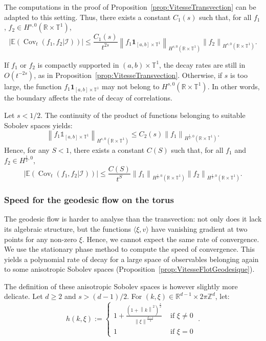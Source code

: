 \documentclass[10pt]{amsart}
\theoremstyle{definition}\newtheorem{defi}[theo]{Definition}\newtheorem{rema}[theo]{Remark}\newtheorem{exam}[theo]{Example}\newtheorem{exem}[theo]{Example}\newtheorem{nota}[theo]{Notation}
\DeclareMathOperator{\Cov}{Cov}
\newcommand{\Z}{\mathbb{Z}}
\newcommand{\R}{\mathbb{R}}
\newcommand{\Ebb}{\mathbb{E}}
\newcommand{\Tbb}{\mathbb{T}}
\newcommand{\Ical}{\mathcal{I}}
\newcommand{\norm}[2]{\left\| #1 \right\|_{#2}}
\newcommand*{\un}{\mathds{1}}
\begin{document}

The computations in the proof of Proposition~\ref{prop:VitesseTransvection} can be adapted to this setting. Thus, there exists a constant $C_1(s)$ such that, for all $f_1$, $f_2 \in H^{s,0} (\R \times \Tbb^1)$,
\[
\big| \Ebb (\Cov_t (f_1, f_2|\Ical)) \big|
\leq \frac{C_1(s)}{t^{2s}} \norm{f_1 \mathbf{1}_{[a, b]\times \Tbb^1}}{H^{s,0} (\R \times \Tbb^1)} \norm{f_2}{H^{s,0} (\R \times \Tbb^1)}.
\]

If $f_1$ or $f_2$ is compactly supported in $(a,b)\times \Tbb^1$, the decay rates are still in $O (t^{-2s})$, as in Proposition~\ref{prop:VitesseTransvection}. Otherwise, if $s$ is too large, the function $f_1 \mathbf{1}_{[a, b]\times \Tbb^1}$ may not belong to $H^{s,0} (\R \times \Tbb^1)$. In other words, the boundary affects the rate of decay of correlations.


Let $s < 1/2$. The continuity of the product of functions belonging to suitable Sobolev spaces yields:
\[
\norm{f_1 \un_{[a, b]\times \Tbb^1}}{H^{s,0} (\R \times \Tbb^1)}
\leq C_2(s) \norm{f_1}{H^{\frac{1}{2},0} (\R \times \Tbb^1)}.
\]
Hence, for any $S <1$, there exists a constant $C(S)$ such that, for all $f_1$ and $f_2 \in H^{\frac{1}{2},0}$,
\[
\big| \Ebb (\Cov_t (f_1, f_2|\Ical)) \big|
\leq \frac{C(S)}{t^S} \norm{f_1}{H^{\frac{1}{2},0} (\R \times \Tbb^1)} \norm{f_2}{H^{\frac{1}{2},0} (\R \times \Tbb^1)}.
\]


\subsubsection{Speed for the geodesic flow on the torus}\label{subsubsec:VitesseTore}


The geodesic flow is harder to analyse than the transvection: not only does it lack its algebraic structure, but the functions $\langle \xi, v \rangle$ have vanishing gradient at two points for any non-zero $\xi$. Hence, we cannot expect the same rate of convergence. We use the stationary phase method to compute the speed of convergence. This yields a polynomial rate of decay for a large space of observables belonging again to some anisotropic Sobolev spaces (Proposition~\ref{prop:VitesseFlotGeodesique}).


The definition of these anisotropic Sobolev spaces is however slightly more delicate. Let $d \geq 2$ and $s>(d-1)/2$. For $(k, \xi) \in \R^{d-1} \times 2 \pi \Z^d$, let:
\[
h (k,\xi) :=
\begin{cases}
1+\frac{(1+\norm{k}{}^2)^{\frac{s}{2}}}{\norm{\xi}{}^{\frac{d-1}{4}}} & \text{ if }  \xi \neq 0 \\
1 & \text{ if } \xi = 0
\end{cases}
\;.
\]
\end{document}
